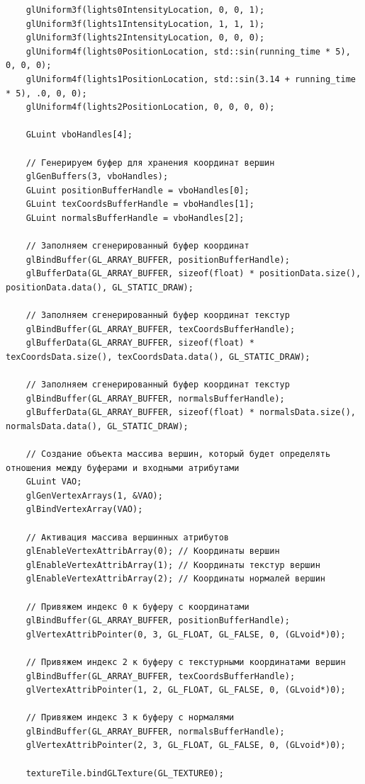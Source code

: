 \documentclass[a4paper,14pt]{extarticle}
\begin{document}
\begin{verbatim}
	glUniform3f(lights0IntensityLocation, 0, 0, 1);
	glUniform3f(lights1IntensityLocation, 1, 1, 1);
	glUniform3f(lights2IntensityLocation, 0, 0, 0);
	glUniform4f(lights0PositionLocation, std::sin(running_time * 5), 0, 0, 0);
	glUniform4f(lights1PositionLocation, std::sin(3.14 + running_time * 5), .0, 0, 0);
	glUniform4f(lights2PositionLocation, 0, 0, 0, 0);

	GLuint vboHandles[4];

	// Генерируем буфер для хранения координат вершин
	glGenBuffers(3, vboHandles);
	GLuint positionBufferHandle = vboHandles[0];
	GLuint texCoordsBufferHandle = vboHandles[1];
	GLuint normalsBufferHandle = vboHandles[2];

	// Заполняем сгенерированный буфер координат
	glBindBuffer(GL_ARRAY_BUFFER, positionBufferHandle);
	glBufferData(GL_ARRAY_BUFFER, sizeof(float) * positionData.size(), positionData.data(), GL_STATIC_DRAW);

	// Заполняем сгенерированный буфер координат текстур
	glBindBuffer(GL_ARRAY_BUFFER, texCoordsBufferHandle);
	glBufferData(GL_ARRAY_BUFFER, sizeof(float) * texCoordsData.size(), texCoordsData.data(), GL_STATIC_DRAW);

	// Заполняем сгенерированный буфер координат текстур
	glBindBuffer(GL_ARRAY_BUFFER, normalsBufferHandle);
	glBufferData(GL_ARRAY_BUFFER, sizeof(float) * normalsData.size(), normalsData.data(), GL_STATIC_DRAW);

	// Создание объекта массива вершин, который будет определять отношения между буферами и входными атрибутами
	GLuint VAO;
	glGenVertexArrays(1, &VAO);
	glBindVertexArray(VAO);

	// Активация массива вершинных атрибутов
	glEnableVertexAttribArray(0); // Координаты вершин
	glEnableVertexAttribArray(1); // Координаты текстур вершин
	glEnableVertexAttribArray(2); // Координаты нормалей вершин

	// Привяжем индекс 0 к буферу с координатами
	glBindBuffer(GL_ARRAY_BUFFER, positionBufferHandle);
	glVertexAttribPointer(0, 3, GL_FLOAT, GL_FALSE, 0, (GLvoid*)0);

	// Привяжем индекс 2 к буферу с текстурными координатами вершин
	glBindBuffer(GL_ARRAY_BUFFER, texCoordsBufferHandle);
	glVertexAttribPointer(1, 2, GL_FLOAT, GL_FALSE, 0, (GLvoid*)0);

	// Привяжем индекс 3 к буферу с нормалями
	glBindBuffer(GL_ARRAY_BUFFER, normalsBufferHandle);
	glVertexAttribPointer(2, 3, GL_FLOAT, GL_FALSE, 0, (GLvoid*)0);

	textureTile.bindGLTexture(GL_TEXTURE0);


\end{verbatim}
\end{document}
